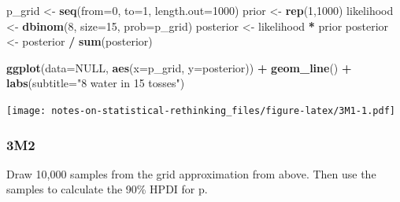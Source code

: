 \documentclass[
]{book}
\newenvironment{Shaded}{\begin{snugshade}}{\end{snugshade}}
\newcommand{\DataTypeTok}[1]{\textcolor[rgb]{0.13,0.29,0.53}{#1}}
\newcommand{\DecValTok}[1]{\textcolor[rgb]{0.00,0.00,0.81}{#1}}
\newcommand{\KeywordTok}[1]{\textcolor[rgb]{0.13,0.29,0.53}{\textbf{#1}}}
\newcommand{\NormalTok}[1]{#1}
\newcommand{\OperatorTok}[1]{\textcolor[rgb]{0.81,0.36,0.00}{\textbf{#1}}}
\newcommand{\OtherTok}[1]{\textcolor[rgb]{0.56,0.35,0.01}{#1}}
\newcommand{\StringTok}[1]{\textcolor[rgb]{0.31,0.60,0.02}{#1}}
\begin{document}
\begin{Shaded}
\begin{Highlighting}[]
\NormalTok{p\_grid \textless{}{-}}\StringTok{ }\KeywordTok{seq}\NormalTok{(}\DataTypeTok{from=}\DecValTok{0}\NormalTok{, }\DataTypeTok{to=}\DecValTok{1}\NormalTok{, }\DataTypeTok{length.out=}\DecValTok{1000}\NormalTok{)}
\NormalTok{prior \textless{}{-}}\StringTok{ }\KeywordTok{rep}\NormalTok{(}\DecValTok{1}\NormalTok{,}\DecValTok{1000}\NormalTok{)}
\NormalTok{likelihood \textless{}{-}}\StringTok{ }\KeywordTok{dbinom}\NormalTok{(}\DecValTok{8}\NormalTok{, }\DataTypeTok{size=}\DecValTok{15}\NormalTok{, }\DataTypeTok{prob=}\NormalTok{p\_grid)}
\NormalTok{posterior \textless{}{-}}\StringTok{ }\NormalTok{likelihood }\OperatorTok{*}\StringTok{ }\NormalTok{prior}
\NormalTok{posterior \textless{}{-}}\StringTok{ }\NormalTok{posterior }\OperatorTok{/}\StringTok{ }\KeywordTok{sum}\NormalTok{(posterior)}

\KeywordTok{ggplot}\NormalTok{(}\DataTypeTok{data=}\OtherTok{NULL}\NormalTok{, }\KeywordTok{aes}\NormalTok{(}\DataTypeTok{x=}\NormalTok{p\_grid, }\DataTypeTok{y=}\NormalTok{posterior)) }\OperatorTok{+}\StringTok{ }
\StringTok{  }\KeywordTok{geom\_line}\NormalTok{() }\OperatorTok{+}
\StringTok{  }\KeywordTok{labs}\NormalTok{(}\DataTypeTok{subtitle=}\StringTok{"8 water in 15 tosses"}\NormalTok{)}
\end{Highlighting}
\end{Shaded}

\texttt{[image: notes-on-statistical-rethinking\_files/figure-latex/3M1-1.pdf]}

\hypertarget{m2-1}{%
\subsubsection*{3M2}\label{m2-1}}

Draw 10,000 samples from the grid approximation from above. Then use the samples to calculate the 90\% HPDI for p.
\end{document}
